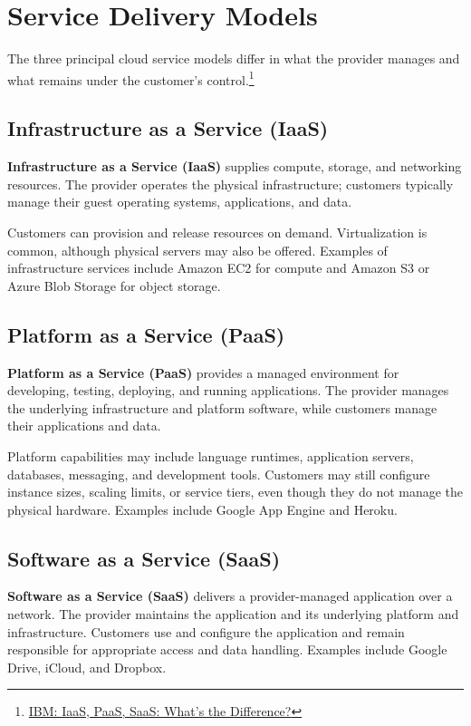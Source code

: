\section{Service Delivery Models}
The three principal cloud service models differ in what the provider manages and what remains under the customer's control.\footnote{\href{https://www.ibm.com/think/topics/iaas-paas-saas}{IBM: IaaS, PaaS, SaaS: What's the Difference?}}

\subsection{Infrastructure as a Service (IaaS)}
\textbf{Infrastructure as a Service (IaaS)} supplies compute, storage, and networking resources. The provider operates the physical infrastructure; customers typically manage their guest operating systems, applications, and data.

Customers can provision and release resources on demand. Virtualization is common, although physical servers may also be offered. Examples of infrastructure services include Amazon EC2 for compute and Amazon S3 or Azure Blob Storage for object storage.

\subsection{Platform as a Service (PaaS)}
\textbf{Platform as a Service (PaaS)} provides a managed environment for developing, testing, deploying, and running applications. The provider manages the underlying infrastructure and platform software, while customers manage their applications and data.

Platform capabilities may include language runtimes, application servers, databases, messaging, and development tools. Customers may still configure instance sizes, scaling limits, or service tiers, even though they do not manage the physical hardware. Examples include Google App Engine and Heroku.

\subsection{Software as a Service (SaaS)}
\textbf{Software as a Service (SaaS)} delivers a provider-managed application over a network. The provider maintains the application and its underlying platform and infrastructure. Customers use and configure the application and remain responsible for appropriate access and data handling. Examples include Google Drive, iCloud, and Dropbox.

